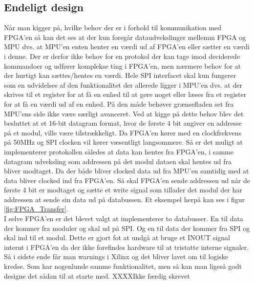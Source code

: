 \subsection{Endeligt design}
Når man kigger på, hvilke behov der er i forhold til kommunikation med FPGA'en så kan det ses at der kun foregår dataudvekslinger mellemm FPGA og MPU dvs. at MPU'en enten henter en værdi ud af FPGA'en eller sætter en værdi i denne. Der er derfor ikke behov for en protokol der kan tage imod deciderede kommandoer og udfører komplekse ting i FPGA'en, men nærmere behov for at der hurtigt kan sættes/hentes en værdi. Hele SPI interfacet skal kun fungerer som en udvidelses af den funktionalitet der allerede ligger i MPU'en dvs. at der skrives til et register for at få en enhed til at gøre noget eller læses fra et register for at få en værdi ud af en enhed. På den måde behøver grænsefladen set fra MPU'ens side ikke være særligt avanceret. Ved at kigge på dette behov blev det besluttet at et 16-bit datagram format, hvor de første 4 bit angiver en addresse på et modul, ville være tilstrækkeligt. Da FPGA'en kører med en clockfrekvens på 50MHz og SPI clocken vil kører væsentligt langsommere. Så er det muligt at implementerer protokollen således at data kan hentes fra FPGA'en, i samme datagram udveksling som addressen på det modul dataen skal hentes ud fra bliver modtaget. Da der både bliver clocked data ud fra MPU'en samtidig med at data bliver clocked ind fra FPGA'en. Så skal FPGA'en sende addressen ud når de første 4 bit er modtaget og sætte et write signal som tillader det modul der har addressen at sende sin data ud på databussen. Et eksempel herpå kan ses i figur \ref{fig:FPGA_Transfer}.\\
I selve FPGA'en er det blevet valgt at implementerer to databusser. En til data der kommer fra moduler og skal ud på SPI. Og en til data der kommer fra SPI og skal ind til et modul. Dette er gjort fot at undgå at bruge et INOUT signal internt i FPGA'en da der ikke forefindes hardware til at tristatte interne signaler. Så i sidste ende får man warnings i Xilinx og det bliver lavet om til logiske kredse. Som har nogenlunde samme funktionalitet, men så kan man ligeså godt designe det sådan til at starte med. XXXXIkke færdig skrevet